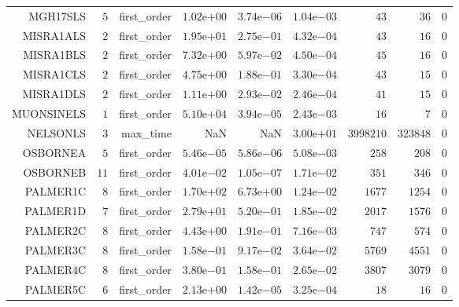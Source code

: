 \begin{longtable}{rrrrrrrrr}
MGH17SLS & \(     5\) & first\_order & \( 1.02\)e\(+00\) & \( 3.74\)e\(-06\) & \( 1.04\)e\(-03\) & \(    43\) & \(    36\) & \(     0\) \\
MISRA1ALS & \(     2\) & first\_order & \( 1.95\)e\(+01\) & \( 2.75\)e\(-01\) & \( 4.32\)e\(-04\) & \(    43\) & \(    16\) & \(     0\) \\
MISRA1BLS & \(     2\) & first\_order & \( 7.32\)e\(+00\) & \( 5.97\)e\(-02\) & \( 4.50\)e\(-04\) & \(    45\) & \(    16\) & \(     0\) \\
MISRA1CLS & \(     2\) & first\_order & \( 4.75\)e\(+00\) & \( 1.88\)e\(-01\) & \( 3.30\)e\(-04\) & \(    43\) & \(    15\) & \(     0\) \\
MISRA1DLS & \(     2\) & first\_order & \( 1.11\)e\(+00\) & \( 2.93\)e\(-02\) & \( 2.46\)e\(-04\) & \(    41\) & \(    15\) & \(     0\) \\
MUONSINELS & \(     1\) & first\_order & \( 5.10\)e\(+04\) & \( 3.94\)e\(-05\) & \( 2.43\)e\(-03\) & \(    16\) & \(     7\) & \(     0\) \\
NELSONLS & \(     3\) & max\_time &       NaN &       NaN & \( 3.00\)e\(+01\) & \(3998210\) & \(323848\) & \(     0\) \\
OSBORNEA & \(     5\) & first\_order & \( 5.46\)e\(-05\) & \( 5.86\)e\(-06\) & \( 5.08\)e\(-03\) & \(   258\) & \(   208\) & \(     0\) \\
OSBORNEB & \(    11\) & first\_order & \( 4.01\)e\(-02\) & \( 1.05\)e\(-07\) & \( 1.71\)e\(-02\) & \(   351\) & \(   346\) & \(     0\) \\
PALMER1C & \(     8\) & first\_order & \( 1.70\)e\(+02\) & \( 6.73\)e\(+00\) & \( 1.24\)e\(-02\) & \(  1677\) & \(  1254\) & \(     0\) \\
PALMER1D & \(     7\) & first\_order & \( 2.79\)e\(+01\) & \( 5.20\)e\(-01\) & \( 1.85\)e\(-02\) & \(  2017\) & \(  1576\) & \(     0\) \\
PALMER2C & \(     8\) & first\_order & \( 4.43\)e\(+00\) & \( 1.91\)e\(-01\) & \( 7.16\)e\(-03\) & \(   747\) & \(   574\) & \(     0\) \\
PALMER3C & \(     8\) & first\_order & \( 1.58\)e\(-01\) & \( 9.17\)e\(-02\) & \( 3.64\)e\(-02\) & \(  5769\) & \(  4551\) & \(     0\) \\
PALMER4C & \(     8\) & first\_order & \( 3.80\)e\(-01\) & \( 1.58\)e\(-01\) & \( 2.65\)e\(-02\) & \(  3807\) & \(  3079\) & \(     0\) \\
PALMER5C & \(     6\) & first\_order & \( 2.13\)e\(+00\) & \( 1.42\)e\(-05\) & \( 3.25\)e\(-04\) & \(    18\) & \(    16\) & \(     0\) \\

\end{longtable}
